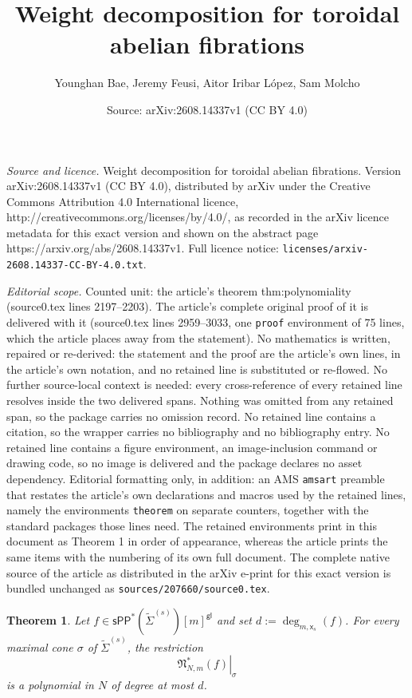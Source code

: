 \documentclass[10pt,a4paper]{amsart}
\title{Weight decomposition for toroidal abelian fibrations}
\author{Younghan Bae, Jeremy Feusi, Aitor Iribar L\'opez, Sam Molcho}
\date{Source: arXiv:2608.14337v1 (CC BY 4.0)}
\newtheorem{theorem}{Theorem}
\newcommand{\sPP}{\mathsf{sPP}}
\newcommand{\spp}{\sPP}
\begin{document}
\maketitle

\noindent\emph{Source and licence.} Weight decomposition for toroidal abelian fibrations. Version arXiv:2608.14337v1 (CC BY 4.0), distributed by arXiv under the Creative Commons Attribution 4.0 International licence, http://creativecommons.org/licenses/by/4.0/, as recorded in the arXiv licence metadata for this exact version and shown on the abstract page https://arxiv.org/abs/2608.14337v1. Full licence notice: \texttt{licenses/arxiv-2608.14337-CC-BY-4.0.txt}.\par\smallskip

\noindent\textit{Editorial scope.} Counted unit: the article's theorem thm:polynomiality (source0.tex lines 2197--2203). The article's complete original proof of it is delivered with it (source0.tex lines 2959--3033, one \texttt{proof} environment of 75 lines, which the article places away from the statement). No mathematics is written, repaired or re-derived: the statement and the proof are the article's own lines, in the article's own notation, and no retained line is substituted or re-flowed.  No further source-local context is needed: every cross-reference of every retained line resolves inside the two delivered spans.  Nothing was omitted from any retained span, so the package carries no omission record.  No retained line contains a citation, so the wrapper carries no bibliography and no bibliography entry.  No retained line contains a figure environment, an image-inclusion command or drawing code, so no image is delivered and the package declares no asset dependency.  Editorial formatting only, in addition: an AMS \texttt{amsart} preamble that restates the article's own declarations and macros used by the retained lines, namely the environments \texttt{theorem} on separate counters, together with the standard packages those lines need.  The retained environments print in this document as Theorem 1 in order of appearance, whereas the article prints the same items with the numbering of its own full document.  The complete native source of the article as distributed in the arXiv e-print for this exact version is bundled unchanged as \texttt{sources/207660/source0.tex}.
\begin{theorem}
	\label{thm:polynomiality}
	Let $f\in \spp^{\ast}(\tilde{\Sigma}^{(s)})[m]^{\mathsf{gl}}$ and set $d:=\deg_{m,\mathsf{x}_s}(f)$. For every maximal cone
	$\sigma$ of $\tilde{\Sigma}^{(s)}$, the restriction
	$$\left.\mathfrak N_{N,m}^\ast(f)\right|_\sigma$$
	is a polynomial in $N$ of degree at most $d$.
\end{theorem}
\end{document}
